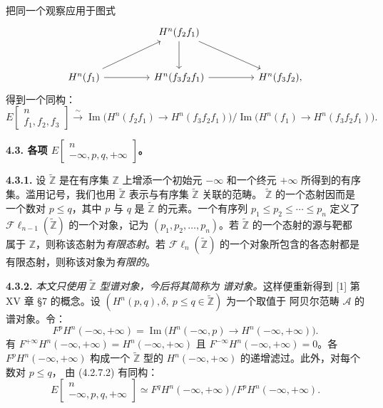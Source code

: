 \clearpage
{}%
\begingroup\small\setlength{\parskip}{0pt}\setlength{\emergencystretch}{2.5em}
把同一个观察应用于图式
\[
\begin{tikzcd}[column sep=4.6em,row sep=2.8em]
&H^n(f_2f_1)\arrow[d]\arrow[dr]&\\
H^n(f_1)\arrow[ur]\arrow[r]&
H^n(f_3f_2f_1)\arrow[r]&H^n(f_3f_2),
\end{tikzcd}
\]
得到一个同构：
\[
E\!\begin{bmatrix}n\\ f_1,f_2,f_3\end{bmatrix}
\xrightarrow{\ \sim\ }
\operatorname{Im}\bigl(H^n(f_2f_1)\longrightarrow H^n(f_3f_2f_1)\bigr)
\Big/
\operatorname{Im}\bigl(H^n(f_1)\longrightarrow H^n(f_3f_2f_1)\bigr).
\tag{4.2.7.2}
\]

\medskip\noindent\textbf{4.3. 各项
$E\!\begin{bmatrix}n\\ -\infty,p,q,+\infty\end{bmatrix}$。}

\medskip\noindent\textbf{4.3.1.}
设 $\widetilde{\mathbb Z}$ 是在有序集 $\mathbb Z$ 上增添一个初始元
$-\infty$ 和一个终元 $+\infty$ 所得到的有序集。滥用记号，我们也用
$\widetilde{\mathbb Z}$ 表示与有序集 $\widetilde{\mathbb Z}$ 关联的范畴。
$\widetilde{\mathbb Z}$ 的一个态射因而是一个数对 $p\leq q$，其中 $p$ 与
$q$ 是 $\widetilde{\mathbb Z}$ 的元素。一个有序列
$p_1\leq p_2\leq\cdots\leq p_n$ 定义了
$\mathcal{F}\ell_{n-1}(\widetilde{\mathbb Z})$ 的一个对象，记为
$(p_1,p_2,\ldots,p_n)$。若 $\widetilde{\mathbb Z}$ 的一个态射的源与靶都
属于 $\mathbb Z$，则称该态射为\textit{有限态射}。若
$\mathcal{F}\ell_n(\widetilde{\mathbb Z})$ 的一个对象所包含的各态射都是
有限态射，则称该对象为\textit{有限的}。

\medskip\noindent\textbf{4.3.2.}
\textit{本文只使用 $\widetilde{\mathbb Z}$ 型谱对象，今后将其简称为
谱对象。}这样便重新得到 [1] 第 XV 章 §7 的概念。设
$(H^n(p,q),\delta,\ p\leq q\in\widetilde{\mathbb Z})$ 为一个取值于
阿贝尔范畴 $\mathcal A$ 的谱对象。令：
\[
F^pH^n(-\infty,+\infty)
=\operatorname{Im}\bigl(H^n(-\infty,p)\longrightarrow
H^n(-\infty,+\infty)\bigr).
\tag{4.3.2.1}
\]
有 $F^{+\infty}H^n(-\infty,+\infty)=H^n(-\infty,+\infty)$ 且
$F^{-\infty}H^n(-\infty,+\infty)=0$。各
$F^pH^n(-\infty,+\infty)$ 构成一个 $\widetilde{\mathbb Z}$ 型的
$H^n(-\infty,+\infty)$ 的递增滤过。此外，对每个数对 $p\leq q$，
由 (4.2.7.2) 有同构：
\[
E\!\begin{bmatrix}n\\ -\infty,p,q,+\infty\end{bmatrix}
\simeq
F^qH^n(-\infty,+\infty)\big/F^pH^n(-\infty,+\infty).
\]
\endgroup
